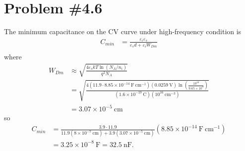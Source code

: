 \documentclass{article}
\begin{document}
\pagebreak
\section*{Problem \#4.6}
The minimum capacitance on the CV curve under high-frequency condition is
\begin{align*}
C_{min} &= \frac{\varepsilon_i \varepsilon_s}{\varepsilon_s d + \varepsilon_i W_{Dm}} \\
\end{align*}
where
\begin{align*}
W_{Dm} &\approx \sqrt{\frac{4 \varepsilon_s kT \ln (N_A / n_i)}{q^2 N_A}} \\
       &=       \sqrt{\frac{4 (11.9 \cdot 8.85 \times 10^{-14} ~\mathrm{F}~\mathrm{cm}^{-1})
                              (0.0259 ~\mathrm{V})
                              \ln\left(\frac{10^{16}}{9.65 \times 10^{9}}\right)}
                           {(1.6 \times 10^{-19} ~\mathrm{C})
                            (10^{16} ~\mathrm{cm}^{-3})}} \\
       &= 3.07 \times 10^{-5} ~\mathrm{cm}
\end{align*}
so
\begin{align*}
C_{min} &= \frac{3.9 \cdot 11.9}{11.9 (8 \times 10^{-7} ~\mathrm{cm}) 
                             +   3.9  (3.07 \times 10^{-5} ~\mathrm{cm})}
           (8.85 \times 10^{-14} ~\mathrm{F}~\mathrm{cm}^{-1}) \\
        &= 3.25 \times 10^{-8} ~\mathrm{F} = 32.5 ~\mathrm{nF}.
\end{align*}
\end{document}
